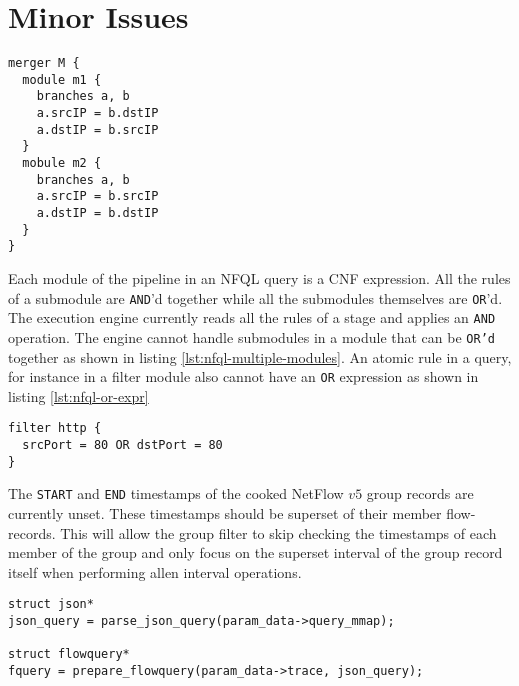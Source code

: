 \section{Minor Issues}\label{sec:minor-issues}

\begin{lstlisting}
merger M {
  module m1 {
    branches a, b
    a.srcIP = b.dstIP
    a.dstIP = b.srcIP
  }
  mobule m2 {
    branches a, b
    a.srcIP = b.srcIP
    a.dstIP = b.dstIP
  }
}
\end{lstlisting}

Each module of the pipeline in an \ac{NFQL} query is a \ac{CNF} expression.
All the rules of a submodule are \texttt{AND}'d together while all the submodules
themselves are \texttt{OR}'d. The execution engine currently reads all the
rules of a stage and applies an \texttt{AND}  operation. The engine cannot handle submodules in a module
that can be \texttt{OR'd} together as shown in listing
\ref{lst:nfql-multiple-modules}. An atomic rule in a query, for instance in a
filter module also cannot have an \texttt{OR} expression as shown in listing
\ref{lst:nfql-or-expr}

\begin{lstlisting}
filter http {
  srcPort = 80 OR dstPort = 80
}
\end{lstlisting}

The \texttt{START} and \texttt{END} timestamps of the cooked NetFlow $v5$
group records are currently unset. These timestamps should be superset of
their member  flow-records.
This will allow the group filter to skip checking the timestamps of each
member of the group and only focus on the superset interval of the group
record itself when performing allen interval operations.

\begin{lstlisting}
struct json*
json_query = parse_json_query(param_data->query_mmap);

struct flowquery*
fquery = prepare_flowquery(param_data->trace, json_query);
\end{lstlisting}

